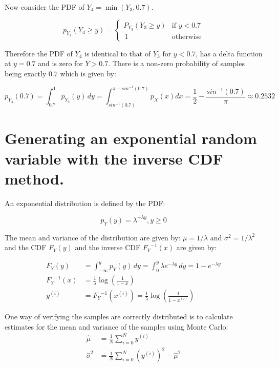 \documentclass[12pt]{article}
\begin{document}
Now consider the PDF of $Y_4 = \min{(Y_3, 0.7)}$.

\begin{equation}
  p_{Y_4}(Y_4 \ge y) =
  \begin{cases} 
    P_{Y_3}(Y_3 \ge y) &\mbox{if } y < 0.7 \\
    \, 1 &\mbox{otherwise}
  \end{cases}
\end{equation}

Therefore the PDF of $Y_4$ is identical to that of $Y_3$ for $y < 0.7$, has a delta function at $y = 0.7$ and is zero for $Y > 0.7$. There is a non-zero probability of samples being exactly $0.7$ which is given by:

$$
  p_{Y_4}(0.7) = 
  \int _ {0.7} ^ 1 p_{Y_3}(y) \, dy = 
  \int _ {sin^{-1}(0.7)} ^ {\pi - sin^{-1}(0.7)} p_X(x) dx =
  \frac 1 2 - \frac {sin^{-1}(0.7)} \pi \approx
  0.2532
$$

\section{Generating an exponential random variable with the inverse CDF method.}

An exponential distribution is defined by the PDF:

\begin{equation}
  p_Y(y)  = \lambda  ^ {- \lambda y}, y \ge 0	
\end{equation}

The mean and variance of the distribution are given by: $\mu = 1 / \lambda$ and $\sigma ^ 2 = 1 / \lambda ^ 2$ and the CDF $F_Y(y)$ and the inverse CDF ${F_Y}^{-1}(x)$ are given by:

\begin{align}
  F_Y (y) &= \int _ {- \infty} ^ y p_Y (y) \, dy =  \int _ 0 ^ y \lambda e ^ {- \lambda y} \, dy = 1 - e ^ {- \lambda y} \\
  {F_Y} ^ {-1} (x) &= \frac 1  \lambda \log {\left( \frac 1 {1 - x} \right)} \\
  y^{(i)} &= {F_Y} ^ {-1} (x ^ {(i)}) = \frac 1  \lambda  \log \left(\frac 1 {1 - x ^ {(i)}}  \right)
\end{align}

One way of verifying the samples are correctly distributed is to calculate estimates for the mean and variance of the samples using Monte Carlo:
\begin{align}
	\hat{\mu} &= \frac 1 N \sum ^ N _ {i=0} y^{(i)} \\
    \hat{\sigma}^2 &= \frac 1 N \sum ^ N _ {i=0} (y^{(i)})^2 - \hat \mu^2
\end{align}
\end{document}

